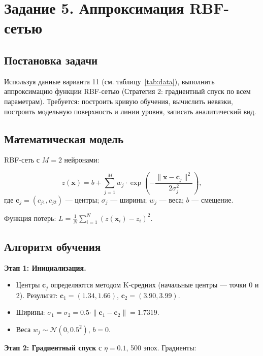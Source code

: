 \section{Задание 5. Аппроксимация RBF-сетью}

\subsection{Постановка задачи}

Используя данные варианта 11 (см. таблицу~\ref{tab:data}), выполнить аппроксимацию функции RBF-сетью (Стратегия 2: градиентный спуск по всем параметрам). Требуется: построить кривую обучения, вычислить невязки, построить модельную поверхность и линии уровня, записать аналитический вид.

\subsection{Математическая модель}

RBF-сеть с $M = 2$ нейронами:

\begin{equation}\label{eq:rbf}
    z(\mathbf{x}) = b + \sum_{j=1}^{M} w_j \cdot \exp\left(-\frac{\|\mathbf{x} - \mathbf{c}_j\|^2}{2\sigma_j^2}\right),
\end{equation}
где $\mathbf{c}_j = (c_{j1}, c_{j2})$ --- центры; $\sigma_j$ --- ширины; $w_j$ --- веса; $b$ --- смещение.

Функция потерь: $L = \frac{1}{N}\sum_{i=1}^{N}(z(\mathbf{x}_i) - z_i)^2$.

\subsection{Алгоритм обучения}

\textbf{Этап 1: Инициализация.}
\begin{itemize}
    \item Центры $\mathbf{c}_j$ определяются методом K-средних (начальные центры --- точки 0 и 2). Результат: $\mathbf{c}_1 = (1.34, 1.66)$, $\mathbf{c}_2 = (3.90, 3.99)$.
    \item Ширины: $\sigma_1 = \sigma_2 = 0.5 \cdot \|\mathbf{c}_1 - \mathbf{c}_2\| = 1.7319$.
    \item Веса $w_j \sim \mathcal{N}(0, 0.5^2)$, $b = 0$.
\end{itemize}

\textbf{Этап 2: Градиентный спуск} с $\eta = 0.1$, 500 эпох. Градиенты:

